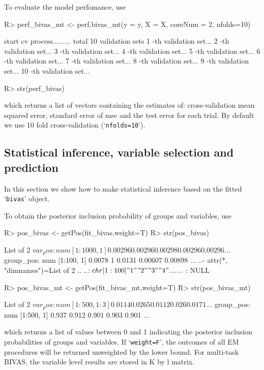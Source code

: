 \documentclass[11pt]{article}
\begin{document}
To evaluate the model perfomance, use
\begin{Schunk}
\begin{Sinput}
R> perf_bivas_mt <- perf.bivas_mt(y = y, X = X, coreNum = 2, nfolds=10)
\end{Sinput}
\begin{Soutput}
start cv process......... total 10 validation sets 
1 -th validation set... 
2 -th validation set... 
3 -th validation set... 
4 -th validation set... 
5 -th validation set... 
6 -th validation set... 
7 -th validation set... 
8 -th validation set... 
9 -th validation set... 
10 -th validation set... 
\end{Soutput}
\begin{Sinput}
R> str(perf_bivas)
\end{Sinput}
\end{Schunk}
which returns a list of vectors containing the estimates of: cross-validation mean squared error, standard error of mse and the test error for each trial. By default we use 10 fold cross-validation (`\texttt{nfolds=10}').


\subsection{Statistical inference, variable selection and prediction}\label{inference}

In this section we show how to make statistical inference based on the fitted `\texttt{bivas}' object.

To obtain the posterior inclusion probability of groups and variables, use
\begin{Schunk}
\begin{Sinput}
R> pos_bivas <- getPos(fit_bivas,weight=T)
R> str(pos_bivas)
\end{Sinput}
\begin{Soutput}
List of 2
 $ var_pos  : num [1:1000, 1] 0.00296 0.00296 0.00298 0.00296 0.00296 ...
 $ group_pos: num [1:100, 1] 0.0078 1 0.0131 0.00607 0.00898 ...
  ..- attr(*, "dimnames")=List of 2
  .. ..$ : chr [1:100] "1" "2" "3" "4" ...
  .. ..$ : NULL
\end{Soutput}
\begin{Sinput}
R> pos_bivas_mt <- getPos(fit_bivas_mt,weight=T)
R> str(pos_bivas_mt)
\end{Sinput}
\begin{Soutput}
List of 2
 $ var_pos  : num [1:500, 1:3] 0.0114 0.0265 0.0112 0.026 0.0171 ...
 $ group_pos: num [1:500, 1] 0.937 0.912 0.901 0.903 0.901 ...
\end{Soutput}
\end{Schunk}
which returns a list of values between 0 and 1 indicating the posterior inclusion probabilities of groups and variables. If `\texttt{weight=F}', the outcomes of all EM procedures will be returned unweighted by the lower bound. For multi-task BIVAS, the variable level results are stored in K by l matrix.
\end{document}
